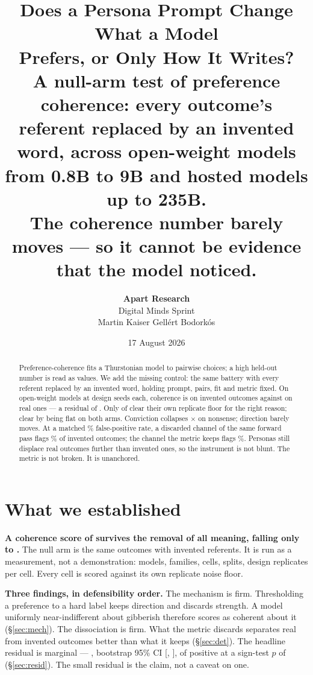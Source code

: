 \documentclass[11pt,a4paper]{article}
\title{\textbf{Does a Persona Prompt Change What a Model\\ Prefers, or Only
How It Writes?}\\[.45em]
\large A null-arm test of preference coherence: every outcome's referent
replaced by an invented word, across \NModels{} open-weight models from 0.8B to
9B and \NHosted{} hosted models up to 235B.\\ The coherence number barely moves
--- so it cannot be evidence that the model noticed.}
\author{\large\textbf{Apart Research}\\[.15em]
\normalsize Digital Minds Sprint\\[.5em]
\normalsize Martin Kaiser \quad Gellért Bodorkós}
\date{17 August 2026}
\begin{document}
\maketitle

\begin{abstract}
\noindent
Preference-coherence fits a Thurstonian model to pairwise choices; a
high held-out number is read as values. We add the missing control: the same
battery with every referent replaced by an invented word, holding prompt, pairs,
fit and metric fixed. On
\NModels{} open-weight models at \NDesignReps{} design seeds each, coherence is
\MeanFloor{} on invented outcomes against \MeanR{} on real ones --- a residual
of \MeanResidual{}. Only \NClearsConviction{} of \NModels{} clear their own replicate floor for the
right reason; \NClearsFlat{} clear by being flat on both arms. Conviction collapses \MedianDecisiveRatio$\times$ on nonsense;
direction barely moves. At a matched \DetFPR{}\% false-positive rate, a discarded channel of the same
forward pass flags \DetBestTPR{}\% of invented outcomes; the channel the metric
keeps flags \DetKeptTPR{}\%.
Personas still displace real outcomes further than invented ones, so the
instrument is not blunt. The metric is not broken. It is unanchored.
\end{abstract}

\section{What we established}

\textbf{A coherence score of \MeanR{} survives the removal of all meaning,
falling only to \MeanFloor{}.} The null arm is the same outcomes with invented
referents. It is run as a measurement, not a demonstration: \NModels{} models,
\NFamilies{} families, \NCells{} cells, \NSplits{} splits, \NDesignReps{}
design replicates per cell. Every cell is scored against its own replicate
noise floor.

\textbf{Three findings, in defensibility order.} The mechanism is
firm. Thresholding a preference to a hard label keeps direction and discards
strength. A model uniformly near-indifferent about gibberish therefore scores as
coherent about it (\S\ref{sec:mech}). The dissociation is firm. What the metric
discards separates real from invented outcomes better than what it keeps
(\S\ref{sec:det}). The headline residual is marginal --- \MeanResidual{},
bootstrap 95\% CI
[\ResidCiLo, \ResidCiHi], \NPositiveModels{} of \NModels{} positive at a
sign-test $p$ of \ResidSignP{} (\S\ref{sec:resid}). The small residual is the
claim, not a caveat on one.
\end{document}
